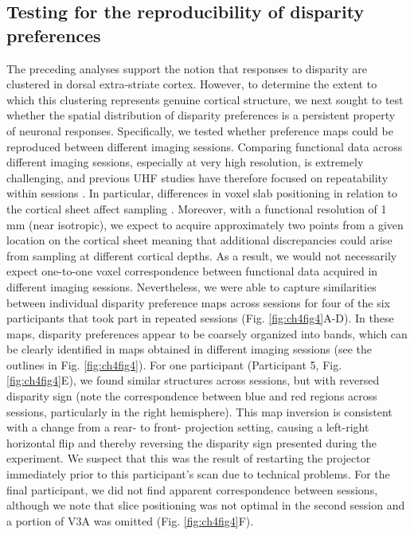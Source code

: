\subsection{Testing for the reproducibility of disparity preferences}
The preceding analyses support the notion that responses to disparity are clustered in dorsal extra-striate cortex. However, to determine the extent to which this clustering represents genuine cortical structure, we next sought to test whether the spatial distribution of disparity preferences is a persistent property of neuronal responses. Specifically, we tested whether preference maps could be reproduced between different imaging sessions. 
Comparing functional data across different imaging sessions, especially at very high resolution, is extremely challenging, and previous UHF studies have therefore focused on repeatability within sessions \cite{Cheng:2001fk,Yacoub:2008hr}. In particular, differences in voxel slab positioning in relation to the cortical sheet affect sampling \cite{Cheng:2001fk}. Moreover, with a functional resolution of 1 mm (near isotropic), we expect to acquire approximately two points from a given location on the cortical sheet meaning that additional discrepancies could arise from sampling at different cortical depths. As a result, we would not necessarily expect one-to-one voxel correspondence between functional data acquired in different imaging sessions.
Nevertheless, we were able to capture similarities between individual disparity preference maps across sessions for four of the six participants that took part in repeated sessions (Fig. \ref{fig:ch4fig4}A-D). In these maps, disparity preferences appear to be coarsely organized into bands, which can be clearly identified in maps obtained in different imaging sessions (see the outlines in Fig. \ref{fig:ch4fig4}). For one participant (Participant 5, Fig. \ref{fig:ch4fig4}E), we found similar structures across sessions, but with reversed disparity sign (note the correspondence between blue and red regions across sessions, particularly in the right hemisphere). This map inversion is consistent with a change from a rear- to front- projection setting, causing a left-right horizontal flip and thereby reversing the disparity sign presented during the experiment. We suspect that this was the result of restarting the projector immediately prior to this participant's scan due to technical problems. For the final participant, we did not find apparent correspondence between sessions, although we note that slice positioning was not optimal in the second session and a portion of V3A was omitted (Fig. \ref{fig:ch4fig4}F).

